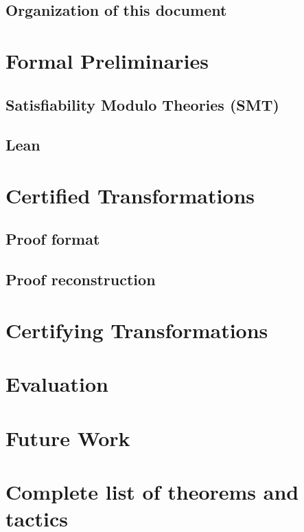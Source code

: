 \documentclass[
	msc,
	english
]{ppgccufmg}
\begin{document}
	  \section{Organization of this document}
	    
	\chapter{Formal Preliminaries}\label{chap:formalPrelim}
      \section{Satisfiability Modulo Theories (SMT)}\label{sec:smt}
        
    \section{Lean}
        
    \chapter{Certified Transformations}\label{chap:certified}
    
      \section{Proof format}\label{sec:gen-scripts}
        
      \section{Proof reconstruction}\label{sec:certified_rcons}
        
    \chapter{Certifying Transformations}\label{chap:rcons}
        
	\chapter{Evaluation}\label{chap:eval}
      
	\chapter{Future Work}\label{chap:future}

    \appendix
    \chapter{Complete list of theorems and tactics}
\end{document}
